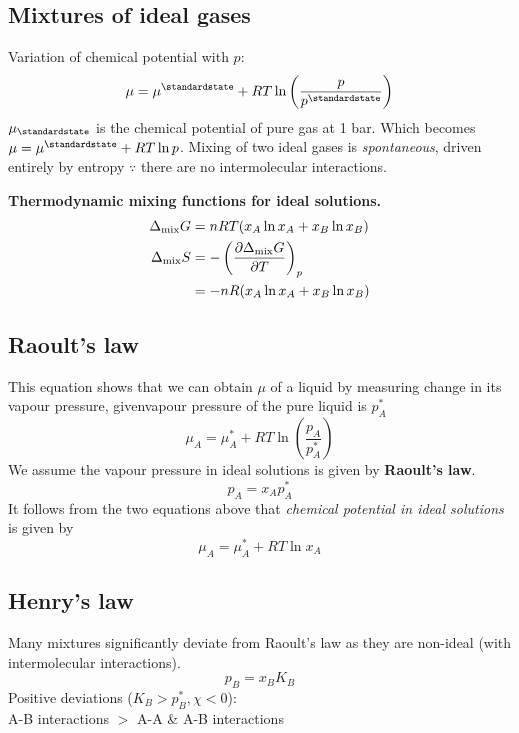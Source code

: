 \subsection*{Mixtures of ideal gases}
Variation of chemical potential with $p$:
\begin{equation*}
    \mu = \mu^\standardstate + RT \ln \left(\frac{p}{p^\standardstate}\right)
\end{equation*}
$\mu_\standardstate$ is the chemical potential of pure gas at 1 bar. Which becomes $ \mu = \mu^\standardstate + RT \ln p$. 
Mixing of two ideal gases is \textit{spontaneous}, driven entirely by entropy $\because$ there are no intermolecular interactions.
\vspace{\baselineskip}

\textbf{Thermodynamic mixing functions for ideal solutions.}
\begin{equation*}
    \begin{aligned}
    \Delta_{\textrm{mix}}G &= nRT(x_A \ln x_A + x_B \ln x_B) \\
    \Delta_{\textrm{mix}}S &= - \left( \pdv{\Delta_{\textrm{mix}}G}{T}\right)_p \\
    &= -nR(x_A \ln x_A + x_B \ln x_B)
    \end{aligned}
\end{equation*}

\subsection*{Raoult's law}
This equation shows that we can obtain $\mu$ of a liquid by measuring
change in its vapour pressure, givenvapour pressure of the pure liquid is $p_A^*$
\begin{equation*}
    \mu_A = \mu_A^* + RT \ln \left(\frac{p_A}{p_A^*}\right)
\end{equation*}
We assume the vapour pressure in ideal solutions is given by \textbf{Raoult's law}.
\begin{equation*}
    p_A = x_A p_A^*
\end{equation*}
It follows from the two equations above that \textit{chemical potential in ideal solutions} is given by
\begin{equation*}
    \mu_A = \mu_A^* + RT \ln x_A
\end{equation*}

\subsection*{Henry's law}
Many mixtures significantly deviate from Raoult's law as they are non-ideal (with intermolecular interactions).
\begin{equation*}
    p_B = x_B K_B
\end{equation*}
Positive deviations ($K_B > p^*_B, \chi < 0$): \\
A-B interactions $>$ A-A \& A-B interactions

